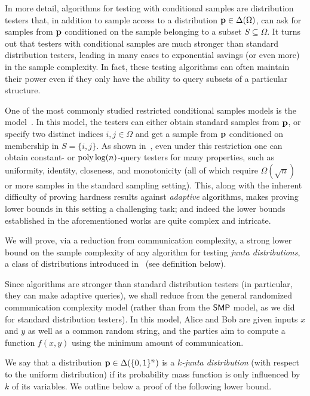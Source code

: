In more detail, algorithms for testing with conditional samples are distribution testers that, in addition to sample access to a distribution $\mathbf{p}\in\Delta\!\left(\Omega\right)$, can ask for samples from $\mathbf{p}$ conditioned on the sample belonging to a subset $S \subseteq \Omega$. It turns out that testers with conditional samples are much stronger than standard distribution testers, leading in many cases to exponential savings (or even more) in the sample complexity. In fact, these testing algorithms can often maintain their power even if they only have the ability to query subsets of a particular structure. 

One of the most commonly studied restricted conditional samples models is the \PCOND model~\cite{CRS:15}. In this model, the testers can either obtain standard samples from $\mathbf{p}$, or specify two distinct indices $i,j \in \Omega$ and get a sample from $\mathbf{p}$ conditioned on membership in $S=\{i,j\}$. As shown in~\cite{CRS:15,Canonne:15:Survey}, even under this restriction one can obtain constant- or $\operatorname*{poly}\log(n)$-query testers for many properties, such as uniformity, identity, closeness, and monotonicity (all of which require $\Omega(\sqrt{n})$ or more samples in the standard sampling setting). This, along with the inherent difficulty of proving hardness results against \emph{adaptive} algorithms, makes proving lower bounds in this setting a challenging task; and indeed the \PCOND lower bounds established in the aforementioned works are quite complex and intricate.


We will prove, via a reduction from communication complexity, a strong lower bound on the sample complexity of any \PCOND algorithm for testing \emph{junta distributions}, a class of distributions introduced in~\cite{ABR:16} (see definition below).

Since \PCOND algorithms are stronger than standard distribution testers (in particular, they can make {adaptive} queries), we shall reduce from the general randomized communication complexity model (rather than from the $\mathsf{SMP}$ model, as we did for standard distribution testers). In this model, Alice and Bob are given inputs $x$ and $y$ as well as a common random string, and the parties aim to compute a function $f(x,y)$ using the minimum amount of communication. 

We say that a distribution $\mathbf{p} \in\Delta\!\left(\{0,1\}^n\right)$ is a \emph{$k$-junta distribution} (with respect to the uniform distribution) if its probability mass function is only influenced by $k$ of its variables. We outline below a proof of the following lower bound.

